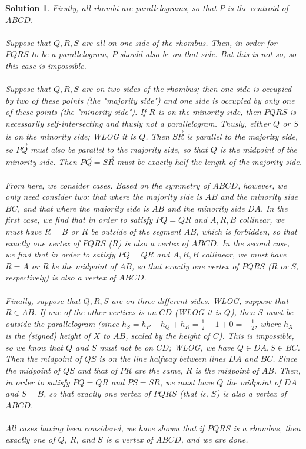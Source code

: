 \documentclass[12pt]{article}
\newtheorem*{solution*}{Solution}
\begin{document}
\begin{solution*}
Firstly, all rhombi are parallelograms, so that $P$ is the centroid of $ABCD$.
\\ \\
Suppose that $Q, R, S$ are all on one side of the rhombus. Then, in order for $PQRS$ to be a parallelogram, $P$ should also be on that side. But this is not so, so this case is impossible.
\\ \\
Suppose that $Q, R, S$ are on two sides of the rhombus; then one side is occupied by two of these points (the "majority side") and one side is occupied by only one of these points (the "minority side"). If $R$ is on the minority side, then $PQRS$ is necessarily self-intersecting and thusly not a parallelogram. Thusly, either $Q$ or $S$ is on the minority side; WLOG it is $Q$. Then $\vec{SR}$ is parallel to the majority side, so $\vec{PQ}$ must also be parallel to the majority side, so that $Q$ is the midpoint of the minority side. Then $\vec{PQ} = \vec{SR}$ must be exactly half the length of the majority side.
\\ \\
From here, we consider cases. Based on the symmetry of $ABCD$, however, we only need consider two: that where the majority side is $AB$ and the minority side $BC$, and that where the majority side is $AB$ and the minority side $DA$. In the first case, we find that in order to satisfy $PQ = QR$ and $A, R, B$ collinear, we must have $R = B$ or $R$ be outside of the segment $AB$, which is forbidden, so that exactly one vertex of $PQRS$ ($R$) is also a vertex of $ABCD$. In the second case, we find that in order to satisfy $PQ = QR$ and $A, R, B$ collinear, we must have $R = A$ or $R$ be the midpoint of $AB$, so that exactly one vertex of $PQRS$ ($R$ or $S$, respectively) is also a vertex of $ABCD$.
\\ \\
Finally, suppose that $Q, R, S$ are on three different sides. WLOG, suppose that $R\in AB$. If one of the other vertices is on $CD$ (WLOG it is $Q$), then $S$ must be outside the parallelogram (since $h_S = h_P - h_Q + h_R = \frac{1}{2} - 1 + 0 = -\frac{1}{2}$, where $h_X$ is the (signed) height of $X$ to $AB$, scaled by the height of $C$). This is impossible, so we know that $Q$ and $S$ must not be on $CD$; WLOG, we have $Q\in DA, S\in BC$. Then the midpoint of $QS$ is on the line halfway between lines $DA$ and $BC$. Since the midpoint of $QS$ and that of $PR$ are the same, $R$ is the midpoint of $AB$. Then, in order to satisfy $PQ = QR$ and $PS = SR$, we must have $Q$ the midpoint of $DA$ and $S = B$, so that exactly one vertex of $PQRS$ (that is, $S$) is also a vertex of $ABCD$.
\\ \\
All cases having been considered, we have shown that if $PQRS$ is a rhombus, then exactly one of $Q$, $R$, and $S$ is a vertex of $ABCD$, and we are done.
\end{solution*}
\end{document}
